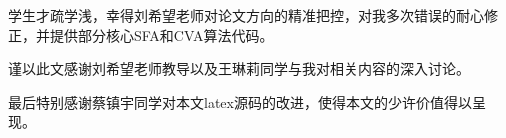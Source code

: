 
\thesisacknowledgement
学生才疏学浅，幸得刘希望老师对论文方向的精准把控，对我多次错误的耐心修正，并提供部分核心SFA和CVA算法代码。

谨以此文感谢刘希望老师教导以及王琳莉同学与我对相关内容的深入讨论。

最后特别感谢蔡镇宇同学对本文latex源码的改进，使得本文的少许价值得以呈现。